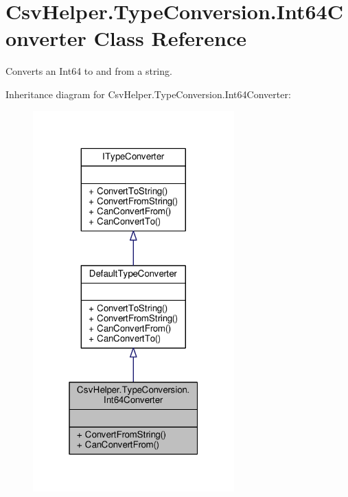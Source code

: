 \hypertarget{a00122}{\section{Csv\-Helper.\-Type\-Conversion.\-Int64\-Converter Class Reference}
\label{a00122}
}


Converts an Int64 to and from a string.  




Inheritance diagram for Csv\-Helper.\-Type\-Conversion.\-Int64\-Converter\-:
\nopagebreak
\begin{figure}[H]
\begin{center}
\leavevmode
\includegraphics[width=220pt]{a00551}
\end{center}
\end{figure}


